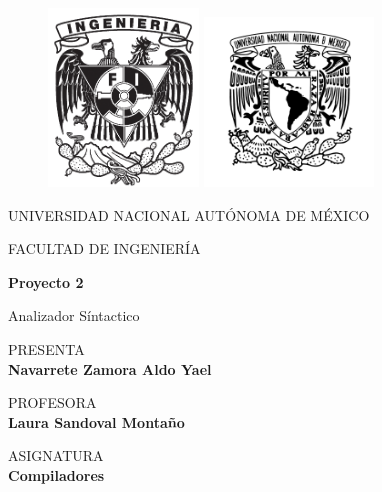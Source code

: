 \documentclass[12pt, a4paper]{article}
\begin{document}
\thispagestyle{empty}
	
\begin{figure}[ht]
		\includegraphics[width=4cm]{fi.png}
		\label{EscudoUABC}
   \endminipage
		\includegraphics[height = 4.5 cm ,width=4.5cm]{unam.png}
		\label{EscudoFC}
	\endminipage
\end{figure}
	
\begin{center}
\vspace{0.8cm}
\LARGE
UNIVERSIDAD NACIONAL AUTÓNOMA DE MÉXICO

\vspace{0.8cm}
\LARGE
FACULTAD DE INGENIERÍA

\vspace{1.7cm}	
\Large
\textbf{Proyecto 2}

\vspace{0.2cm}
\LARGE
Analizador Síntactico

\vspace{1.3cm}
\normalsize	
PRESENTA \\
\vspace{.3cm}
\large
\textbf{Navarrete Zamora Aldo Yael}

\vspace{1.3cm}
\normalsize	
PROFESORA \\
\vspace{.3cm}
\large
\textbf{Laura Sandoval Montaño}

\vspace{1.3cm}
\normalsize	
ASIGNATURA \\
\vspace{.3cm}
\large
\textbf{Compiladores}
\end{center}
\end{document}
